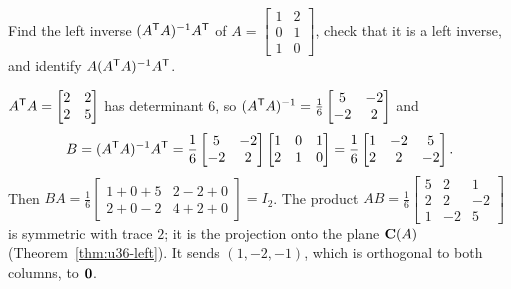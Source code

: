 \begin{exercise}\label{exr:u36-left}
Find the left inverse $(A^{\mathsf{T}} A)^{-1}A^{\mathsf{T}}$ of $A=\begin{bmatrix}1&2\\0&1\\1&0\end{bmatrix}$, check that it is a left inverse, and identify $A(A^{\mathsf{T}} A)^{-1}A^{\mathsf{T}}$.
\end{exercise}
\begin{solution}
$A^{\mathsf{T}} A=\begin{bmatrix}2&2\\2&5\end{bmatrix}$ has determinant $6$, so $(A^{\mathsf{T}} A)^{-1}=\frac16\begin{bmatrix}5&-2\\-2&2\end{bmatrix}$ and
\[
B=(A^{\mathsf{T}} A)^{-1}A^{\mathsf{T}}=\frac16\begin{bmatrix}5&-2\\-2&2\end{bmatrix}\begin{bmatrix}1&0&1\\2&1&0\end{bmatrix}=\frac16\begin{bmatrix}1&-2&5\\2&2&-2\end{bmatrix}.
\]
Then $BA=\frac16\begin{bmatrix}1+0+5&2-2+0\\2+0-2&4+2+0\end{bmatrix}=I_2$. The product
$AB=\frac16\begin{bmatrix}5&2&1\\2&2&-2\\1&-2&5\end{bmatrix}$
is symmetric with trace $2$; it is the projection onto the plane $\mathbf{C}(A)$ (Theorem~\ref{thm:u36-left}). It sends $(1,-2,-1)$, which is orthogonal to both columns, to $\boldsymbol{0}$.
\end{solution}

